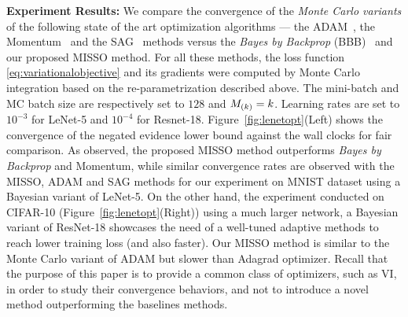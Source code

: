 \documentclass[final,12pt]{alt2022} %
\begin{document}
\textbf{Experiment Results:}
We compare the convergence of the \textit{Monte Carlo variants} of the following state of the art optimization algorithms --- the ADAM~\cite{kingma:adam}, the Momentum~\cite{sutskever2013importance} and the SAG~\cite{schmidt2017minimizing} methods versus the \textit{Bayes by Backprop} (BBB)~\cite{blundell2015weight} and our proposed MISSO method.
For all these methods, the loss function \eqref{eq:variationalobjective} and its gradients were computed by Monte Carlo integration based on the re-parametrization described above.
The mini-batch and MC batch size are respectively set to $128$ and $\Bsize{k} = k$. 
Learning rates are set to $10^{-3}$ for LeNet-5 and $10^{-4}$ for Resnet-18. 
Figure~\ref{fig:lenetopt}(Left) shows the convergence of the negated evidence lower bound against the wall clocks for fair comparison. 
As observed, the proposed MISSO method outperforms \textit{Bayes by Backprop} and Momentum, while similar convergence rates are observed with the MISSO, ADAM and SAG methods for our experiment on MNIST dataset using a Bayesian variant of LeNet-5. 
On the other hand, the experiment conducted on CIFAR-10 (Figure~\ref{fig:lenetopt}(Right)) using a much larger network, \ie a Bayesian variant of ResNet-18 showcases the need of a well-tuned adaptive methods to reach lower training loss (and also faster). Our MISSO method is similar to the Monte Carlo variant of ADAM but slower than Adagrad optimizer. Recall that the purpose of this paper is to provide a common class of optimizers, such as VI, in order to study their convergence behaviors, and not to introduce a novel method outperforming the baselines methods.


%
%
%
\end{document}
